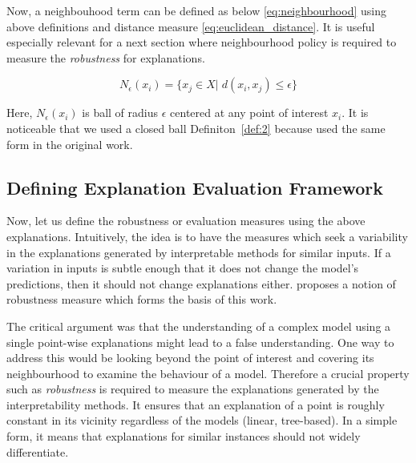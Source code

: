\documentclass[english]{tktltiki2}
\theoremstyle{definition}
\theoremstyle{remark}
\newcommand{\onespace}{\;}
\begin{document}
Now, a neighbouhood term can be defined as below \eqref{eq:neighbourhood} using above definitions and distance measure \eqref{eq:euclidean_distance}. It is useful especially relevant for a next section where neighbourhood policy is required to measure the \textit{robustness} for explanations. 

\begin{equation}\label{eq:neighbourhood}
N_{\epsilon}(x_i) = \{x_j \in X| \onespace d(x_i, x_j) \leq \epsilon\}
\end{equation}  

Here, $N_{\epsilon}(x_{i})$ is ball of radius $\epsilon$ centered at any point of interest $x_i$. It is noticeable that we used a closed ball Definiton~\ref{def:2} because \citep{alvarez2018robustness} used the same form in the original work.

\subsection{Defining Explanation Evaluation Framework}\label{sec:defining_explanation_evaluation_framework} %

Now, let us define the robustness or evaluation measures using the above explanations. Intuitively, the idea is to have the measures which seek a variability in the explanations generated by interpretable methods for similar inputs. If a variation in inputs is subtle enough that it does not change the model's predictions, then it should not change explanations either. \citet{alvarez2018robustness} proposes a notion of robustness measure which forms the basis of this work.

The critical argument was that the understanding of a complex model using a single point-wise explanations might lead to a false understanding. One way to address this would be looking beyond the point of interest and covering its neighbourhood to examine the behaviour of a model. Therefore a crucial property such as \textit{robustness} is required to measure the explanations generated by the interpretability methods. It ensures that an explanation of a point is roughly constant in its vicinity regardless of the models (linear, tree-based).  In a simple form, it means that explanations for similar instances should not widely differentiate.
\end{document}
